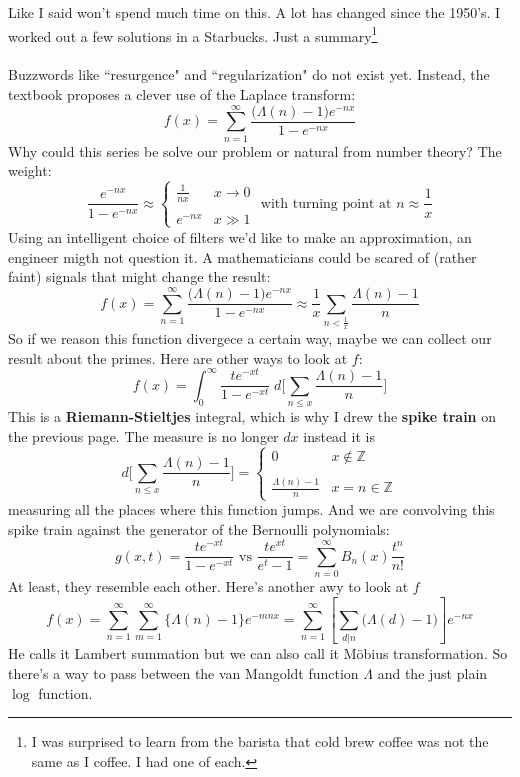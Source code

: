 \documentclass[12pt]{article}
\begin{document}
\noindent Like I said won't spend much time on this. A lot has changed since the 1950's.  I worked out a few solutions in a Starbucks.  Just a summary\footnote{I was surprised to learn from the barista that cold brew coffee was not the same as I coffee.  I had one of each.} \\ \\ 
Buzzwords like ``resurgence" and ``regularization" do not exist yet.  Instead, the textbook proposes a clever use of the Laplace transform:
$$ f(x) = \sum_{n=1}^\infty \frac{\big(\Lambda(n)-1\big)e^{-nx}}{1 - e^{-nx}} $$
Why could this series be solve our problem or natural from number theory? The weight:
$$ \frac{ e^{-nx}}{1 - e^{-nx}} \approx \left\{
\begin{array}{cc} 
\frac{1}{nx} & x \to 0 \\ \\
e^{-nx} & x \gg 1 \end{array}
 \right. \text{ with turning point at } n \approx \frac{1}{x}$$
Using an intelligent choice of filters we'd like to make an approximation, an engineer migth not question it.  A mathematicians could be scared of (rather faint) signals that might change the result:
$$ f(x) = \sum_{n=1}^\infty \frac{\big(\Lambda(n)-1\big)e^{-nx}}{1 - e^{-nx}} \approx 
\frac{1}{x} \sum_{n < \frac{1}{x}} \frac{\Lambda(n)-1}{n}$$
So if we reason this function divergece a certain way, maybe we can collect our result about the primes.  Here are other ways to look at $f$:
$$ f(x) = \int_0^\infty \frac{te^{-xt}}{1 - e^{-xt}} \;d \Bigg[ \sum_{n \leq x} \frac{\Lambda(n)-1}{n}\Bigg] $$
This is a \textbf{Riemann-Stieltjes} integral, which is why I drew the \textbf{spike train} on the previous page.  The measure is no longer $dx$  instead it is 
$$ d \Bigg[ \sum_{n \leq x} \frac{\Lambda(n)-1}{n}\Bigg] = 
\left\{ \begin{array}{cl}
 0 & x \notin \mathbb{Z} \\ \\
 \frac{\Lambda(n)-1}{n}  & x=n \in \mathbb{Z}  \end{array}\right. $$ 
measuring all the places where this function jumps.  And we are convolving this spike train against the generator of the Bernoulli polynomials:
$$ g(x,t) = \frac{te^{-xt}}{1 - e^{-xt}}  \text{ vs } \frac{te^{xt}}{e^t - 1} = \sum_{n=0}^\infty B_n(x) \frac{t^n}{n!} $$
At least, they resemble each other.  Here's another awy to look at $f$
$$ f(x) = \sum_{n=1}^\infty \sum_{m=1}^\infty \{ \Lambda(n)-1 \} e^{-mnx} = 
\sum_{n=1}^\infty \left[ \sum_{d|n} \big(\Lambda(d)-1\big) \right] e^{-nx}$$
He calls it Lambert summation but we can also call it M\"{o}bius transformation.  So there's a way to pass between the van Mangoldt function $\Lambda$ and the just plain $\log$ function.  
\end{document}
